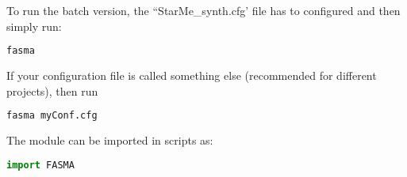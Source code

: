 \documentclass[a4paper,12pt]{article}
\begin{document}
To run the batch version, the ``StarMe\_synth.cfg' file has to configured and then simply run:
\begin{lstlisting}[language=Python]
fasma
\end{lstlisting}

If your configuration file is called something else (recommended for different projects), then run
\begin{lstlisting}[language=Python]
fasma myConf.cfg
\end{lstlisting}

The module can be imported in scripts as:
\begin{lstlisting}[language=Python]
import FASMA
\end{lstlisting}
\end{document}
